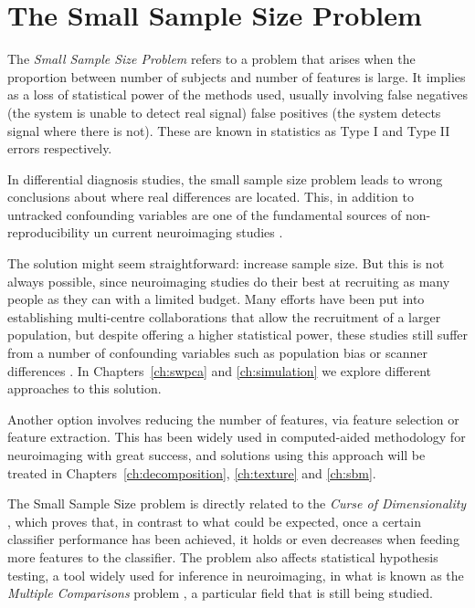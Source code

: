\section{The Small Sample Size Problem}\label{sec:smallsamplesize}
The \textit{Small Sample Size Problem} refers to a problem that arises when the proportion between number of subjects and number of features is large. It implies as a loss of statistical power of the methods used, usually involving false negatives (the system is unable to detect real signal) false positives (the system detects signal where there is not). These are known in statistics as Type I and Type II errors respectively. 

In differential diagnosis studies, the small sample size problem leads to wrong conclusions about where real differences are located. This, in addition to untracked confounding variables are one of the fundamental sources of non-re\-pro\-du\-ci\-bi\-li\-ty un current neuroimaging studies \cite{Button2013}. 

The solution might seem straightforward: increase sample size. But this is not always possible, since neuroimaging studies do their best at recruiting as many people as they can with a limited budget. Many efforts have been put into establishing multi-centre collaborations that allow the recruitment of a larger population, but despite offering a higher statistical power, these studies still suffer from a number of confounding variables such as population bias or scanner differences \cite{haar2014anatomical}. In Chapters~\ref{ch:swpca} and \ref{ch:simulation} we explore different approaches to this solution. 

Another option involves reducing the number of features, via feature selection or feature extraction. This has been widely used in computed-aided methodology for neuroimaging \cite{DeMartino2007,xu2009source,Gorriz2010,Illan2011,Martinez-Murcia2016} with great success, and solutions using this approach will be treated in Chapters~\ref{ch:decomposition}, \ref{ch:texture} and \ref{ch:sbm}. 

The Small Sample Size problem is directly related to the \textit{Curse of Dimensionality} \cite{Krishnaiah1982}, which proves that, in contrast to what could be expected, once a certain classifier performance has been achieved, it holds or even decreases when feeding more features to the classifier. The problem also affects statistical hypothesis testing, a tool widely used for inference in neuroimaging, in what is known as the \textit{Multiple Comparisons} problem \cite{Benjamini2010}, a particular field that is still being studied. 

